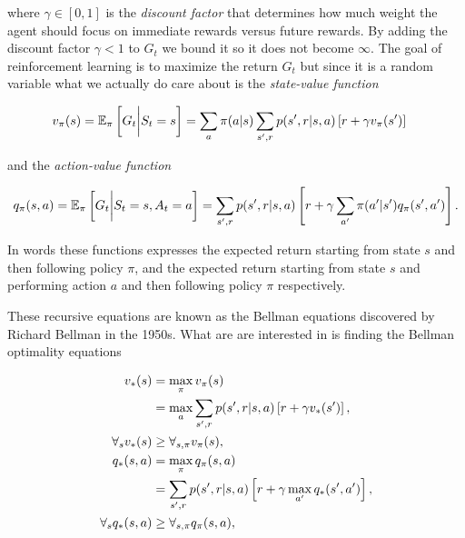 \documentclass[result.tex]{subfiles}
\begin{document}
    where $\gamma \in \left[0, 1 \right]$ is the \textit{discount factor} that determines how much weight the agent should focus on immediate rewards versus future rewards. By adding the discount factor $\gamma < 1$ to $G_t$ we bound it so it does not become $\infty$. The goal of reinforcement learning is to maximize the return $G_t$ but since it is a random variable what we actually do care about is the \textit{state-value function}

    \begin{align*}
        v_{\pi}(s) &= \mathbb{E}_\pi \left[ G_t \bigg\rvert S_t = s \right]
        = \sum_a \pi(a | s) \sum_{s^\prime, r} p(s^\prime, r | s, a) \left[ r + \gamma v_\pi(s^\prime) \right]
    \end{align*}

    and the \textit{action-value function}

    \begin{align*}
        q_{\pi}(s, a) = \mathbb{E}_\pi \left[ G_t \bigg\rvert S_t = s, A_t = a \right]
        = \sum_{s^\prime, r} p(s^\prime, r | s, a) \left[ r + \gamma \sum_{a^\prime} \pi(a^\prime | s^\prime) q_\pi(s^\prime, a^\prime) \right].
    \end{align*}

    In words these functions expresses the expected return starting from state $s$ and then following policy $\pi$, and the expected return starting from state $s$ and performing action $a$ and then following policy $\pi$ respectively.

    These recursive equations are known as the Bellman equations discovered by Richard Bellman in the 1950s. What are are interested in is finding the Bellman optimality equations

    \begin{align*}
        v_{\ast}(s)
        &= \max_{\pi} v_{\pi}(s) \\
        &= \max_a \sum_{s^\prime, r} p(s^\prime, r | s, a) \left[ r + \gamma v_\ast(s^\prime) \right], \\
        \forall_s v_{\ast}(s) &\geq \forall_{s, \pi} v_{\pi}(s), \\
        q_{\ast}(s, a)
        &= \max_{\pi} q_{\pi}(s, a) \\
        &= \sum_{s^\prime, r} p(s^\prime, r | s, a) \left[ r + \gamma \max_{a^\prime} q_\ast(s^\prime, a^\prime) \right], \\
        \forall_s q_{\ast}(s, a) &\geq \forall_{s, \pi} q_{\pi}(s, a),
    \end{align*}
\end{document}
